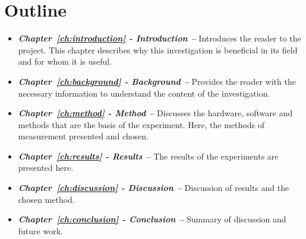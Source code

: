 \section{Outline}
\begin{itemize}
    \item \textit{\textbf{Chapter~\ref{ch:introduction} - Introduction --}} Introduces the reader to the project. This chapter describes why this investigation is beneficial in its field and for whom it is useful.
    \item \textit{\textbf{Chapter~\ref{ch:background} - Background --}} Provides the reader with the necessary information to understand the content of the investigation.
    \item \textit{\textbf{Chapter~\ref{ch:method} - Method --}} Discusses the hardware, software and methods that are the basis of the experiment. Here, the methods of measurement presented and chosen.
    \item \textit{\textbf{Chapter~\ref{ch:results} - Results --}} The results of the experiments are presented here.
    \item \textit{\textbf{Chapter~\ref{ch:discussion} - Discussion --}} Discussion of results and the chosen method.
    \item \textit{\textbf{Chapter~\ref{ch:conclusion} - Conclusion --}} Summary of discussion and future work.
\end{itemize}
